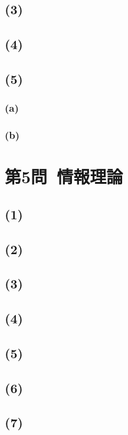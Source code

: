 \documentclass[a4paper,12pt,xelatex,ja=standard]{bxjsarticle}
\begin{document}
  \subsection*{(3)}
  \subsection*{(4)}
  \subsection*{(5)}
    \subsubsection*{(a)}
    \subsubsection*{(b)}

\section*{第5問\ 情報理論}
  \subsection*{(1)}
  \subsection*{(2)}
  \subsection*{(3)}
  \subsection*{(4)}
  \subsection*{(5)}
  \subsection*{(6)}
  \subsection*{(7)}
\end{document}
